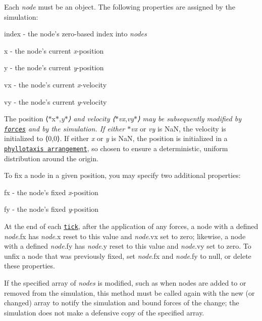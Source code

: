 Each {\itshape node} must be an object. The following properties are assigned by the simulation\+:


\begin{DoxyItemize}
\item {\ttfamily index} -\/ the node’s zero-\/based index into {\itshape nodes}
\item {\ttfamily x} -\/ the node’s current {\itshape x}-\/position
\item {\ttfamily y} -\/ the node’s current {\itshape y}-\/position
\item {\ttfamily vx} -\/ the node’s current {\itshape x}-\/velocity
\item {\ttfamily vy} -\/ the node’s current {\itshape y}-\/velocity
\end{DoxyItemize}

The position ⟨$\ast$x$\ast$,{\itshape y$\ast$⟩ and velocity ⟨$\ast$vx},{\itshape vy$\ast$⟩ may be subsequently modified by \href{#forces}{\tt forces} and by the simulation. If either $\ast$vx} or {\itshape vy} is NaN, the velocity is initialized to ⟨0,0⟩. If either {\itshape x} or {\itshape y} is NaN, the position is initialized in a \href{http://bl.ocks.org/mbostock/11478058}{\tt phyllotaxis arrangement}, so chosen to ensure a deterministic, uniform distribution around the origin.

To fix a node in a given position, you may specify two additional properties\+:


\begin{DoxyItemize}
\item {\ttfamily fx} -\/ the node’s fixed {\itshape x}-\/position
\item {\ttfamily fy} -\/ the node’s fixed {\itshape y}-\/position
\end{DoxyItemize}

At the end of each \href{#simulation_tick}{\tt tick}, after the application of any forces, a node with a defined {\itshape node}.fx has {\itshape node}.x reset to this value and {\itshape node}.vx set to zero; likewise, a node with a defined {\itshape node}.fy has {\itshape node}.y reset to this value and {\itshape node}.vy set to zero. To unfix a node that was previously fixed, set {\itshape node}.fx and {\itshape node}.fy to null, or delete these properties.

If the specified array of {\itshape nodes} is modified, such as when nodes are added to or removed from the simulation, this method must be called again with the new (or changed) array to notify the simulation and bound forces of the change; the simulation does not make a defensive copy of the specified array.

